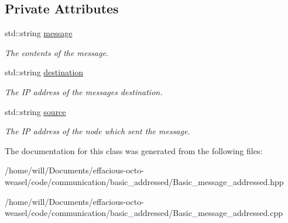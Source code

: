 \subsection*{Private Attributes}
\begin{DoxyCompactItemize}
\item 
std\+::string \hyperlink{class_basic__message__addressed_aff938f855fbf89de5ded4eacdf3d1209}{message}\hypertarget{class_basic__message__addressed_aff938f855fbf89de5ded4eacdf3d1209}{}\label{class_basic__message__addressed_aff938f855fbf89de5ded4eacdf3d1209}

\begin{DoxyCompactList}\small\item\em The contents of the message. \end{DoxyCompactList}\item 
std\+::string \hyperlink{class_basic__message__addressed_a4210300c97bb3f9ec9537d50b53dd886}{destination}\hypertarget{class_basic__message__addressed_a4210300c97bb3f9ec9537d50b53dd886}{}\label{class_basic__message__addressed_a4210300c97bb3f9ec9537d50b53dd886}

\begin{DoxyCompactList}\small\item\em The IP address of the messages destination. \end{DoxyCompactList}\item 
std\+::string \hyperlink{class_basic__message__addressed_a4ca8307b924c1e8afa567839cc1989da}{source}\hypertarget{class_basic__message__addressed_a4ca8307b924c1e8afa567839cc1989da}{}\label{class_basic__message__addressed_a4ca8307b924c1e8afa567839cc1989da}

\begin{DoxyCompactList}\small\item\em The IP address of the node which sent the message. \end{DoxyCompactList}\end{DoxyCompactItemize}


The documentation for this class was generated from the following files\+:\begin{DoxyCompactItemize}
\item 
/home/will/\+Documents/effacious-\/octo-\/weasel/code/communication/basic\+\_\+addressed/Basic\+\_\+message\+\_\+addressed.\+hpp\item 
/home/will/\+Documents/effacious-\/octo-\/weasel/code/communication/basic\+\_\+addressed/Basic\+\_\+message\+\_\+addressed.\+cpp\end{DoxyCompactItemize}
